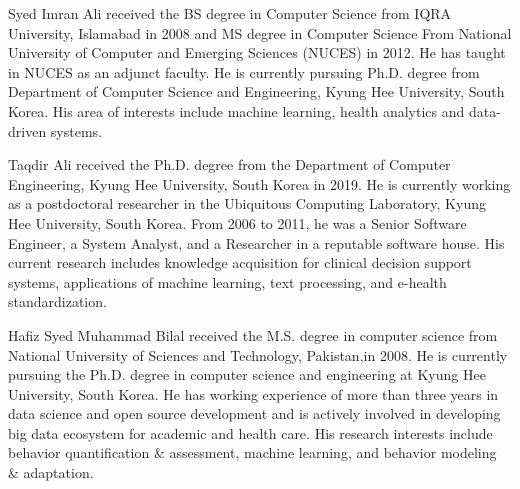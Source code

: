 \documentclass{ieeeaccess}
\begin{document}
\begin{IEEEbiography}{Syed Imran Ali} received the BS degree in Computer Science from IQRA University, Islamabad in 2008 and MS degree in Computer Science From National University of Computer and Emerging Sciences (NUCES) in 2012. He has taught in NUCES as an adjunct faculty. He is currently pursuing Ph.D. degree from Department of Computer Science and Engineering, Kyung Hee University, South Korea. His area of interests include machine learning, health analytics and data-driven systems.
\end{IEEEbiography}
\begin{IEEEbiography}{Taqdir Ali} received the Ph.D. degree from the Department of Computer Engineering, Kyung Hee University, South Korea in 2019. He is currently working as a postdoctoral researcher in the Ubiquitous Computing Laboratory, Kyung Hee University, South Korea. From 2006 to 2011, he was a Senior Software Engineer, a System Analyst, and a Researcher in a reputable software house. His current research includes knowledge acquisition for clinical decision support systems, applications of machine learning, text processing, and e-health standardization.
\end{IEEEbiography}
\begin{IEEEbiography}{Hafiz Syed Muhammad Bilal}  received the M.S. degree in computer science from National University of Sciences and Technology, Pakistan,in 2008. He is currently pursuing the Ph.D. degree in computer science and engineering at Kyung Hee University, South Korea. He has working experience of more than three years in data science and open source development and is actively involved in developing big data ecosystem for academic and health care. His research interests include behavior quantification \& assessment, machine learning, and behavior modeling \& adaptation.
\end{IEEEbiography}
\end{document}
